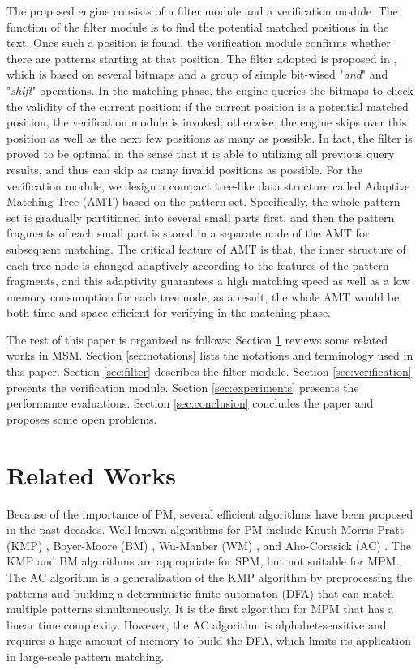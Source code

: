 The proposed engine consists of a filter module and a verification
module. The function of the filter module is to find the potential
matched positions in the text. Once such a position is found, the
verification module confirms whether there are patterns starting at
that position. The filter adopted is proposed in \cite{Lee2013}, which
is based on several bitmaps and a group of simple bit-wised
"\emph{and}" and "\emph{shift}" operations. In the matching phase, the
engine queries the bitmaps to check the validity of the current
position: if the current position is a potential matched position, the
verification module is invoked; otherwise, the engine skips over this
position as well as the next few positions as many as possible. In
fact, the filter is proved to be optimal in the sense that it is able
to utilizing all previous query results, and thus can skip as many
invalid positions as possible. For the verification module, we design
a compact tree-like data structure called Adaptive Matching Tree
(\textsf{AMT}) based on the pattern set. Specifically, the whole
pattern set is gradually partitioned into several small parts first,
and then the pattern fragments of each small part is stored in a
separate node of the AMT for subsequent matching. The critical feature
of AMT is that, the inner structure of each tree node is changed
adaptively according to the features of the pattern fragments, and
this adaptivity guarantees a high matching speed as well as a low
memory consumption for each tree node, as a result, the whole AMT
would be both time and space efficient for verifying in the matching
phase.

The rest of this paper is organized as follows: Section
\ref{sec:related works} reviews some related works in MSM. Section
\ref{sec:notations} lists the notations and terminology used in this
paper. Section \ref{sec:filter} describes the filter module. Section
\ref{sec:verification} presents the verification module. Section
\ref{sec:experiments} presents the performance evaluations. Section
\ref{sec:conclusion} concludes the paper and proposes some open
problems.

\section{Related Works}
\label{sec:related works}

Because of the importance of PM, several efficient algorithms have
been proposed in the past decades. Well-known algorithms for PM
include Knuth-Morris-Pratt (\textsf{KMP}) \cite{Knuth1977},
Boyer-Moore (\textsf{BM}) \cite{Boyer1977}, Wu-Manber (\textsf{WM})
\cite{Wu1994}, and Aho-Corasick (\textsf{AC}) \cite{Aho1975}. The
\textsf{KMP} and \textsf{BM} algorithms are appropriate for SPM, but
not suitable for MPM. The \textsf{AC} algorithm is a generalization of
the \textsf{KMP} algorithm by preprocessing the patterns and building
a deterministic finite automaton (DFA) that can match multiple
patterns simultaneously. It is the first algorithm for MPM that has a
linear time complexity. However, the \textsf{AC} algorithm is
alphabet-sensitive and requires a huge amount of memory to build the
DFA, which limits its application in large-scale pattern matching.

